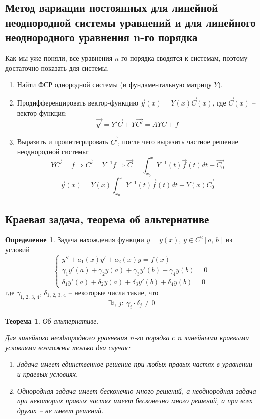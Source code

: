 \documentclass[a4paper,12pt]{article}
\theoremstyle{plain}
\newtheorem{theorem}{Теорема}[section]
\theoremstyle{definition}
\newtheorem{definition}{Определение}[section]
\theoremstyle{remark}
\begin{document}
\subsection{Метод вариации постоянных для линейной неоднородной системы уравнений и для линейного неоднородного уравнения n-го порядка}
Как мы уже поняли, все уравнения $n$-го порядка сводятся к системам, поэтому достаточно показать для системы.

\begin{enumerate}
	\item Найти ФСР однородной системы (и фундаментальную матрицу $Y$).
	\item Продифференцировать вектор-функцию $\vec{y}(x) = Y(x)\vec{C}(x)$, где $\vec{C}(x)$ -- вектор-функция:
	      \[\vec{y'} = Y'\vec{C} + Y\vec{C'} = AYC + f\]
	\item Выразить и проинтегрировать $\vec{C'}$, после чего выразить частное решение неоднородной системы:
	      \[Y\vec{C'} = f \Rightarrow \vec{C'} = Y^{-1}f \Rightarrow \vec{C} = \int_{x_0}^xY^{-1}(t)\vec{f}(t)dt + \vec{C_0}\]
	      \[\vec{y}(x) = Y(x)\int_{x_0}^xY^{-1}(t)\vec{f}(t)dt + Y(x)\vec{C_0}\]
\end{enumerate}

\subsection{Краевая задача, теорема об альтернативе}
\begin{definition}
	Задача нахождения функции $y = y(x),\, y \in C^2[a,\,b]$ из условий
	\[
		\begin{cases}
			y'' + a_1(x)y' + a_2(x)y = f(x)                                 \\
			\gamma_1y'(a) + \gamma_2y(a) + \gamma_3y'(b) + \gamma_4y(b) = 0 \\
			\delta_1y'(a) + \delta_2y(a) + \delta_3y'(b) + \delta_4y(b) = 0
		\end{cases}
	\]
	где $\gamma_{1,\,2,\,3,\,4},\, \delta_{1,\,2,\,3,\,4}$ -- некоторые числа такие, что
	\[\exists i,\, j:\: \gamma_i \cdot \delta_j \neq 0\]
\end{definition}

\begin{theorem}
	Об альтернативе.

	Для линейного неоднородного уравнения $n$-го порядка с $n$ линейными краевыми условиями возможны только два случая:
	\begin{enumerate}
		\item Задача имеет единственное решение при любых правых частях в уравнении и краевых условиях.
		\item Однородная задача имеет бесконечно много решений, а неоднородная задача при некоторых правых частях имеет бесконечно много решений, а при всех других -- не имеет решений.
	\end{enumerate}
\end{theorem}
\end{document}
